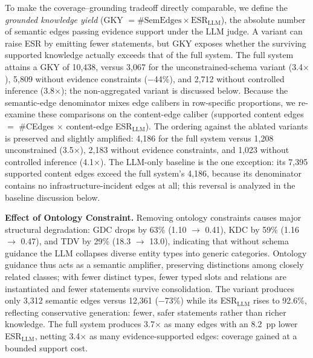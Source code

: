 \documentclass[a4paper,fleqn]{cas-dc}
\begin{document}
To make the coverage--grounding tradeoff directly comparable, we
define the \emph{grounded knowledge yield}
(GKY $= \#\text{SemEdges} \times \text{ESR}_{\text{LLM}}$), the
absolute number of semantic edges passing evidence support under the
LLM judge.
A variant can raise ESR by emitting fewer statements, but GKY exposes
whether the surviving supported knowledge actually exceeds that of
the full system.
The full system attains a GKY of 10{,}438, versus 3{,}067 for the
unconstrained-schema variant (3.4$\times$), 5{,}809 without evidence
constraints ($-$44\%), and 2{,}712 without controlled inference
(3.8$\times$); the non-aggregated variant is discussed below.
Because the semantic-edge denominator mixes edge calibers in
row-specific proportions, we re-examine these comparisons on the
content-edge caliber (supported content edges $=$ \#CEdges $\times$
content-edge ESR$_{\text{LLM}}$).
The ordering against the ablated variants is preserved and slightly
amplified: 4{,}186 for the full system versus 1{,}208
unconstrained (3.5$\times$), 2{,}183 without evidence constraints,
and 1{,}023 without controlled inference (4.1$\times$).
The LLM-only baseline is the one exception: its 7{,}395 supported
content edges exceed the full system's 4{,}186, because its
denominator contains no infrastructure-incident edges at all; this
reversal is analyzed in the baseline discussion below.

\textbf{Effect of Ontology Constraint.}
Removing ontology constraints causes major structural degradation:
GDC drops by 63\% (1.10 $\to$ 0.41), KDC by 59\% (1.16 $\to$ 0.47),
and TDV by 29\% (18.3 $\to$ 13.0), indicating that without schema
guidance the LLM collapses diverse entity types into generic
categories.
Ontology guidance thus acts as a semantic amplifier, preserving
distinctions among closely related classes; with fewer distinct
types, fewer typed slots and relations are instantiated and fewer
statements survive consolidation.
The variant produces only 3{,}312 semantic edges versus 12{,}361
($-$73\%) while its ESR$_{\text{LLM}}$ rises to 92.6\%, reflecting
conservative generation: fewer, safer statements rather than richer
knowledge.
The full system produces 3.7$\times$ as many edges with an 8.2~pp
lower ESR$_{\text{LLM}}$, netting 3.4$\times$ as many
evidence-supported edges: coverage gained at a bounded support cost.
\end{document}
